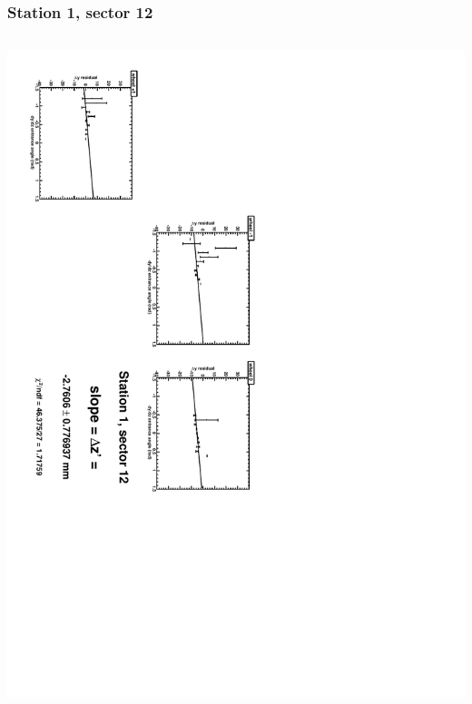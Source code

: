 \documentclass[compress]{beamer}
\begin{document}
\begin{frame}
\frametitle{Station 1, sector 12}
\begin{columns}
\includegraphics[height=\linewidth, angle=90]{zfits/zfit_1_12.pdf}


\end{columns}
\end{frame}
\end{document}
